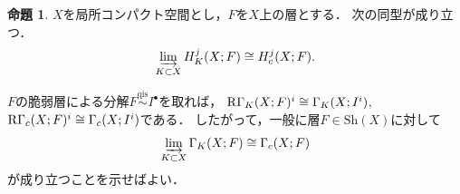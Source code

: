\documentclass[leqno, 10pt, a4paper, dvipdfmx]{jsarticle}
\makeatletter
\theoremstyle{definition}
\renewenvironment{proof}[1][\proofname]{\par
  \pushQED{\qed}%
  \normalfont \topsep6\p@\@plus6\p@\relax
  \trivlist
  \item[\hskip\labelsep
         \bfseries
    {#1}]\ignorespaces
}{%
  \popQED\endtrivlist\@endpefalse
}
\renewcommand{\proofname}{証明.}
\numberwithin{equation}{section}
\newcommand{\RG}{\mathop{\mathrm{R}\hspace{-0pt}\Gamma}\nolimits}
\newcommand{\indlim}[1][]{\mathop{\varinjlim}\limits_{#1}}
\newcommand{\Sh}{\mathrm{Sh}}
\theoremstyle{mystyle}
\newtheorem{PRP}[AXM]{命題}
\newcommand{\qis}{\stackrel{\text{qis}}{\sim}}%
\makeatother
\begin{document}
\begin{PRP}
    \(X\)を局所コンパクト空間とし，\(F\)を\(X\)上の層とする．
    次の同型が成り立つ．
    \[
        \indlim[K\subset X]H_K^j(X;F)
        \cong
        H^j_c(X;F).
    \]
\end{PRP}
\begin{proof}
    \(F\)の脆弱層による分解\(F\qis I^\bullet\)を取れば，
    \(\RG_K(X;F)^i\cong\Gamma_K(X;I^i)\), 
    \(\RG_c(X;F)^i\cong\Gamma_c(X;I^i)\)である．
    したがって，一般に層\(F\in\Sh(X)\)に対して\[
        \indlim[K\subset X]\Gamma_K(X;F)\cong \Gamma_c(X;F)
    \]が成り立つことを示せばよい．
\end{proof}
\end{document}
